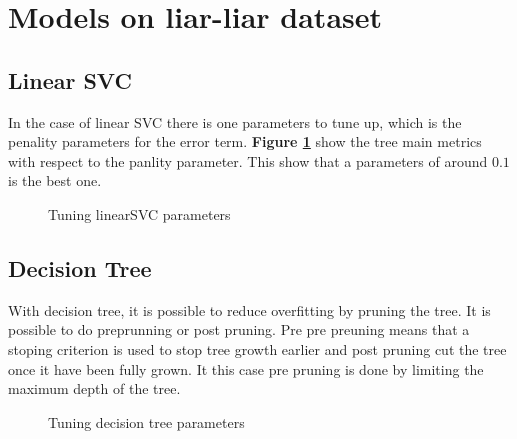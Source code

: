 \section{Models on liar-liar dataset}
\subsection{Linear SVC}
In the case of linear SVC there is one parameters to tune up, which is the penality parameters for the error term. \textbf{Figure \ref{fig:chap3:linearSVC}} show the tree main metrics with respect to the panlity parameter. This show that a parameters of around $0.1$ is the best one. 

\begin{figure}[]
	\centering
	\caption{Tuning linearSVC parameters }
	\label{fig:chap3:linearSVC}
\end{figure}

\subsection{Decision Tree}
With decision tree, it is possible to reduce overfitting by pruning the tree. It is possible to do preprunning or post pruning. Pre pre preuning means that a stoping criterion is used to stop tree growth earlier and post pruning cut the tree once it have been fully grown. It this case pre pruning is done by limiting the maximum depth of the tree. 

\begin{figure}[]
	\centering
	\caption{Tuning decision tree parameters }
	\label{fig:chap3:dt}
\end{figure}

